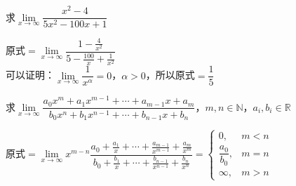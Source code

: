 \documentclass[11pt,fleqn]{book} %
\begin{document}
\begin{example}
求$\lim\limits_{x \rightarrow \infty}\dfrac{x^2-4}{5x^2-100x+1}$
\end{example}
\begin{solution}
原式$=\lim\limits_{x \rightarrow \infty}\dfrac{1-\frac{4}{x^2}}{5-\frac{100}{x}+\frac{1}{x^2}}$\\
可以证明：$\lim\limits_{x \rightarrow \infty}\dfrac{1}{x^\alpha}=0$，$\alpha>0$，所以原式$=\dfrac{1}{5}$
\end{solution}
\begin{example}
求$\lim\limits_{x \rightarrow \infty}\dfrac{a_0x^m+a_1x^{m-1}+\cdots+a_{m-1}x+a_m}{b_0x^n+b_1x^{n-1}+\cdots+b_{n-1}x+b_n}$，$m,n \in \mathds{N}$，$a_i,b_i \in \mathds{R}$
\end{example}
\begin{solution}
原式$=\lim\limits_{x \rightarrow \infty}x^{m-n}\dfrac{a_0+\frac{a_1}{x}+\cdots+\frac{a_{m-1}}{x^{m-1}}+\frac{a_{m}}{x^{m}}}{b_0+\frac{b_{1}}{x}+\cdots+\frac{b_{n-1}}{x^{n-1}}+\frac{b_{n}}{x^{n}}}=
\left\{
\begin{array}{ll}
0, & m<n \\
\dfrac{a_0}{b_0}, & m=n \\
\infty, & m>n
\end{array}
\right.$
\end{solution}
\end{document}
